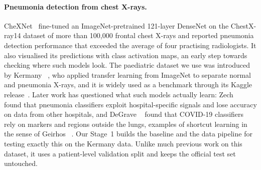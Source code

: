 \paragraph{Pneumonia detection from chest X-rays.}
CheXNet~\cite{rajpurkar2017chexnet} fine-tuned an ImageNet-pretrained 121-layer DenseNet on the ChestX-ray14 dataset
of more than 100,000 frontal chest X-rays and reported pneumonia detection performance that exceeded the average of four practising radiologists.
It also visualised its predictions with class activation maps, an early step towards checking where such models look.
The paediatric dataset we use was introduced by Kermany \etal~\cite{kermany2018identifying}, who applied transfer learning from ImageNet to separate normal and pneumonia X-rays,
and it is widely used as a benchmark through its Kaggle release~\cite{mooney2018kaggle}.
Later work has questioned what such models actually learn: Zech \etal~\cite{zech2018variable} found that pneumonia classifiers exploit hospital-specific signals and lose accuracy on data from other hospitals,
and DeGrave \etal~\cite{degrave2021ai} found that COVID-19 classifiers rely on markers and regions outside the lungs, examples of shortcut learning in the sense of Geirhos \etal~\cite{geirhos2020shortcut}.
Our Stage~1 builds the baseline and the data pipeline for testing exactly this on the Kermany data. Unlike much previous work on this dataset, it uses a patient-level validation split and keeps the official test set untouched.
